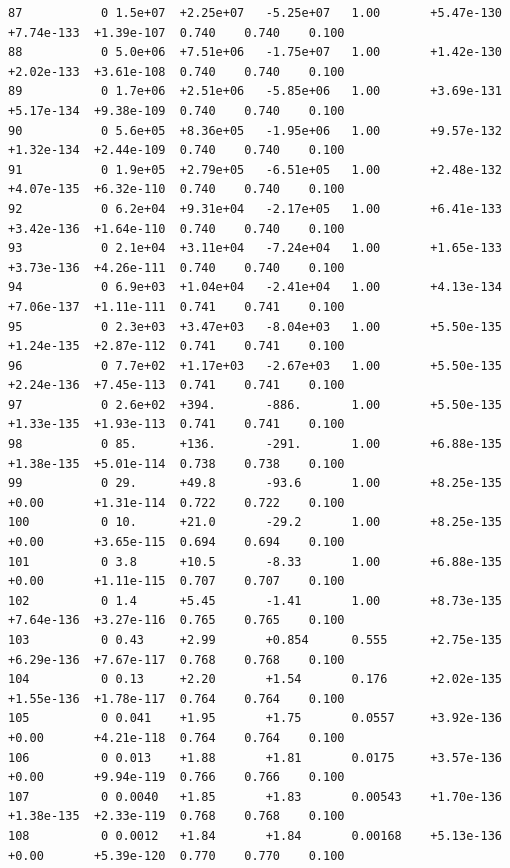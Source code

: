 \documentclass[12pt]{article}
\numberwithin{equation}{section}
\begin{document}
\begin{lstlisting}
87           0 1.5e+07  +2.25e+07   -5.25e+07   1.00       +5.47e-130  +7.74e-133  +1.39e-107  0.740    0.740    0.100
88           0 5.0e+06  +7.51e+06   -1.75e+07   1.00       +1.42e-130  +2.02e-133  +3.61e-108  0.740    0.740    0.100
89           0 1.7e+06  +2.51e+06   -5.85e+06   1.00       +3.69e-131  +5.17e-134  +9.38e-109  0.740    0.740    0.100
90           0 5.6e+05  +8.36e+05   -1.95e+06   1.00       +9.57e-132  +1.32e-134  +2.44e-109  0.740    0.740    0.100
91           0 1.9e+05  +2.79e+05   -6.51e+05   1.00       +2.48e-132  +4.07e-135  +6.32e-110  0.740    0.740    0.100
92           0 6.2e+04  +9.31e+04   -2.17e+05   1.00       +6.41e-133  +3.42e-136  +1.64e-110  0.740    0.740    0.100
93           0 2.1e+04  +3.11e+04   -7.24e+04   1.00       +1.65e-133  +3.73e-136  +4.26e-111  0.740    0.740    0.100
94           0 6.9e+03  +1.04e+04   -2.41e+04   1.00       +4.13e-134  +7.06e-137  +1.11e-111  0.741    0.741    0.100
95           0 2.3e+03  +3.47e+03   -8.04e+03   1.00       +5.50e-135  +1.24e-135  +2.87e-112  0.741    0.741    0.100
96           0 7.7e+02  +1.17e+03   -2.67e+03   1.00       +5.50e-135  +2.24e-136  +7.45e-113  0.741    0.741    0.100
97           0 2.6e+02  +394.       -886.       1.00       +5.50e-135  +1.33e-135  +1.93e-113  0.741    0.741    0.100
98           0 85.      +136.       -291.       1.00       +6.88e-135  +1.38e-135  +5.01e-114  0.738    0.738    0.100
99           0 29.      +49.8       -93.6       1.00       +8.25e-135  +0.00       +1.31e-114  0.722    0.722    0.100
100          0 10.      +21.0       -29.2       1.00       +8.25e-135  +0.00       +3.65e-115  0.694    0.694    0.100
101          0 3.8      +10.5       -8.33       1.00       +6.88e-135  +0.00       +1.11e-115  0.707    0.707    0.100
102          0 1.4      +5.45       -1.41       1.00       +8.73e-135  +7.64e-136  +3.27e-116  0.765    0.765    0.100
103          0 0.43     +2.99       +0.854      0.555      +2.75e-135  +6.29e-136  +7.67e-117  0.768    0.768    0.100
104          0 0.13     +2.20       +1.54       0.176      +2.02e-135  +1.55e-136  +1.78e-117  0.764    0.764    0.100
105          0 0.041    +1.95       +1.75       0.0557     +3.92e-136  +0.00       +4.21e-118  0.764    0.764    0.100
106          0 0.013    +1.88       +1.81       0.0175     +3.57e-136  +0.00       +9.94e-119  0.766    0.766    0.100
107          0 0.0040   +1.85       +1.83       0.00543    +1.70e-136  +1.38e-135  +2.33e-119  0.768    0.768    0.100
108          0 0.0012   +1.84       +1.84       0.00168    +5.13e-136  +0.00       +5.39e-120  0.770    0.770    0.100

\end{lstlisting}
\end{document}
